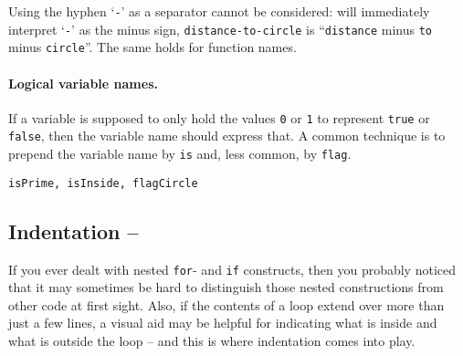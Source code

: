 \begin{remark}
Using the hyphen `\lstinline!-!' as a separator cannot be considered:
\matlab{} will immediately interpret `\lstinline!-!' as the minus sign,
\lstinline!distance-to-circle! is ``\lstinline!distance! minus \lstinline!to!
minus \lstinline!circle!''. The same holds for function names.
\end{remark}


\paragraph{Logical variable names.}
If a variable is supposed to only hold the values \lstinline!0! or
\lstinline!1! to represent \lstinline!true! or \lstinline!false!, then the
variable name should express that. A common technique is to prepend the
variable name by \lstinline!is! and, less common, by \lstinline!flag!.
\begin{lstlisting}
isPrime, isInside, flagCircle
\end{lstlisting}


\subsection{Indentation -- \cleansymbol\cleansymbol\cleansymbol\cleansymbol}

If you ever dealt with nested \lstinline!for!- and \lstinline!if! constructs,
then you probably noticed that it may sometimes be hard to distinguish those
nested constructions from other code at first sight. Also, if the contents of
a loop extend over more than just a few lines, a visual aid may be helpful for
indicating what is inside and what is outside the loop -- and this is where
indentation comes into play.

